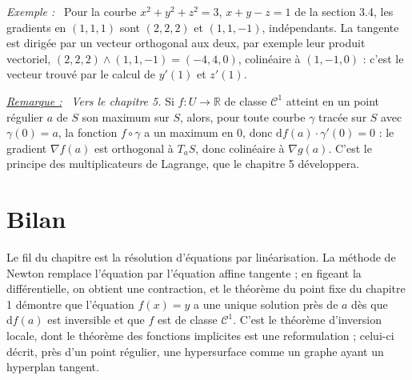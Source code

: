 \documentclass[a4paper,twoside]{report}
\newenvironment{exemple}%
 {\par\needspace{6\baselineskip}\vspace{1mm}\begin{list}{}{\leftmargin=1cm \rightmargin=0.5cm}\item[]%
  \textit{Exemple :}~}%
 {\end{list}\vspace{1mm}}
\newenvironment{remarque}%
 {\par\needspace{6\baselineskip}\vspace{1mm}\begin{list}{}{\leftmargin=1cm \rightmargin=0.5cm}\item[]%
  \textit{\underline{Remarque :}}~}%
 {\end{list}\vspace{1mm}}
\newcommand{\R}{\mathbb{R}}
\newcommand{\dd}{\mathrm{d}}                      %
\newcommand{\Cc}{\mathcal{C}}                     %
\newcommand{\grad}{\nabla}                        %
\begin{document}
\begin{exemple}
Pour la courbe $x^{2} + y^{2} + z^{2} = 3$, $x + y - z = 1$ de la section 3.4, les gradients en $(1, 1, 1)$ sont $(2, 2, 2)$ et $(1, 1, -1)$, indépendants. La tangente est dirigée par un vecteur orthogonal aux deux, par exemple leur produit vectoriel, $(2, 2, 2) \wedge (1, 1, -1) = (-4, 4, 0)$, colinéaire à $(1, -1, 0)$ : c'est le vecteur trouvé par le calcul de $y'(1)$ et $z'(1)$.
\end{exemple}

\begin{remarque}
\emph{Vers le chapitre 5.} Si $f : U \to \R$ de classe $\Cc^{1}$ atteint en un point régulier $a$ de $S$ son maximum sur $S$, alors, pour toute courbe $\gamma$ tracée sur $S$ avec $\gamma(0) = a$, la fonction $f \circ \gamma$ a un maximum en $0$, donc $\dd f(a)\cdot\gamma'(0) = 0$ : le gradient $\grad f(a)$ est orthogonal à $T_{a}S$, donc colinéaire à $\grad g(a)$. C'est le principe des multiplicateurs de Lagrange, que le chapitre 5 développera.
\end{remarque}
\newpage
\section{Bilan}

Le fil du chapitre est la résolution d'équations par linéarisation. La méthode de Newton remplace l'équation par l'équation affine tangente ; en figeant la différentielle, on obtient une contraction, et le théorème du point fixe du chapitre 1 démontre que l'équation $f(x) = y$ a une unique solution près de $a$ dès que $\dd f(a)$ est inversible et que $f$ est de classe $\Cc^{1}$. C'est le théorème d'inversion locale, dont le théorème des fonctions implicites est une reformulation ; celui-ci décrit, près d'un point régulier, une hypersurface comme un graphe ayant un hyperplan tangent.
\end{document}
